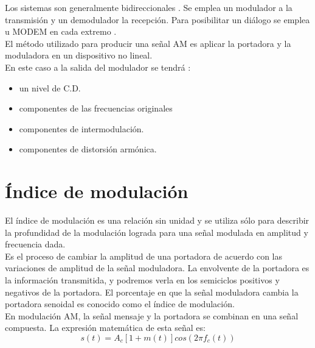 \documentclass{article}
\begin{document}
Los sistemas son generalmente bidireccionales . Se emplea un modulador a la transmisión y un demodulador la recepción. Para posibilitar un diálogo  se emplea u MODEM en cada extremo .\\

El método utilizado para producir una señal AM es aplicar la portadora y la moduladora en un dispositivo no lineal.\\

En este caso a la salida del modulador  se tendrá  :\\

\begin{itemize}
    \item un nivel de C.D.

 \item componentes de las frecuencias originales

 \item componentes de intermodulación.

 \item componentes de  distorsión armónica.
\end{itemize}

\section{Índice de modulación}

El índice de modulación es una relación sin unidad y se utiliza sólo para describir la profundidad de la modulación lograda para una señal modulada en amplitud y frecuencia dada.\citep{IndiceModulacion}\\

Es el proceso de cambiar la amplitud de una portadora de acuerdo con las variaciones de amplitud de la señal moduladora. La envolvente de la portadora es la información transmitida, y podremos verla en los semiciclos positivos y negativos de la portadora. El porcentaje en que la señal moduladora cambia la portadora senoidal es conocido como el
índice de modulación.\citep{IndiceModulacion}\\

En modulación AM, la señal mensaje y la portadora se combinan en una señal compuesta. La expresión matemática de esta señal es:\citep{IndiceModulacion}\\

\begin{equation}
    s(t)=A_c[1+m(t)]cos(2 \pi f_c(t))
    \label{portadora}
\end{equation}
\end{document}
